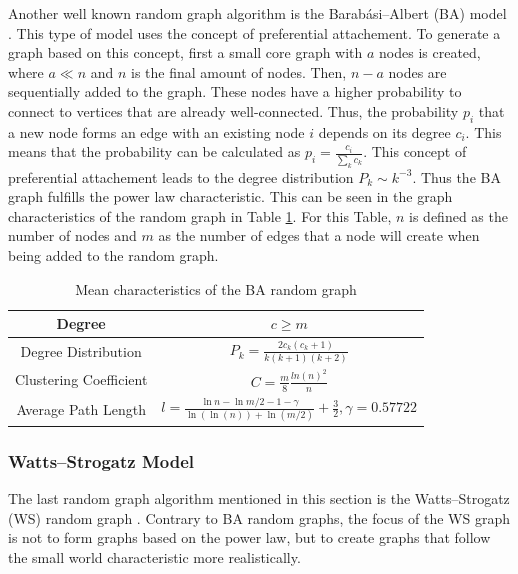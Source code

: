 Another well known random graph algorithm is the Barabási–Albert (BA) model 
\cite{barabasimodel}. 
This type of model uses the concept of preferential attachement.
To generate a graph based on this concept, first a small \glqq core\grqq{}
graph with $a$ nodes is created, where $a\ll n$ and $n$ is the final amount of nodes.
Then, $n-a$ nodes are sequentially added to the graph.
These nodes have a higher 
probability to connect to vertices that are already well-connected. 
Thus, the probability $p_i$ that a new node forms an edge with an
existing node $i$ depends on its degree $c_i$. This means that the
probability can be calculated as $p_i= \frac{c_i}{\sum_{k}c_k}$.
This concept of preferential attachement leads to the degree distribution
$P_k\sim k^{-3}$. Thus the BA graph 
fulfills the power law characteristic.
This can be seen in the graph characteristics of the random graph
in Table \ref{ba-model}. For this Table, $n$ is defined as the number
of nodes and $m$ as the number of edges that a node
will create when being added to the random graph.

\begin{table}[ht!]
    \centering
    \begin{tabular}{|c | c |} 
     \hline
     Degree & $c\geq m$ \\ 
     \hline
     Degree Distribution & 
     $P_k = \frac{2c_k(c_k+1)}{k(k+1)(k+2)}$ \\ 
     \hline
     Clustering Coefficient \cite{ba_cluster_coeff} & 
     $C=\frac{m}{8}\frac{ln(n)^2}{n}$ \\ 
     \hline
     Average Path Length \cite{averagepath}& 
     $l = \frac{\ln{n}- \ln{m/2} - 1 - \gamma}{\ln(\ln(n))+\ln{(m/2)}} + \frac{3}{2}, 
     \gamma=0.57722$ \\ 
     \hline
    \end{tabular}
    \caption{Mean characteristics of the BA random graph \cite{basicnetwork}}
    \label{ba-model}
\end{table}

\subsubsection{Watts–Strogatz Model}
The last random graph algorithm mentioned in this section 
is the Watts–Strogatz (WS) random graph \cite{wattsmodel}.
Contrary to BA random graphs, the focus of the WS graph is not to 
form graphs based on the power law, but to create graphs
that follow the small world characteristic more realistically.

